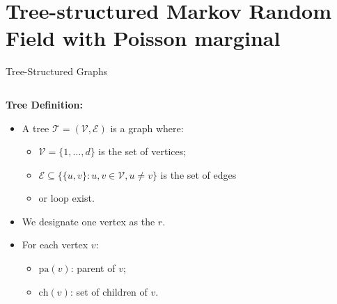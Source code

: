 \documentclass[11pt,xcolor={dvipsnames},hyperref={pdftex,pdfpagemode=UseNone,hidelinks,pdfdisplaydoctitle=true},usepdftitle=false]{beamer}
\begin{document}
\section{Tree-structured Markov Random Field with Poisson marginal}
\begin{frame}{Tree-Structured Graphs}
\begin{columns}
    \begin{column}{0.6\textwidth}
        \textbf{Tree Definition:}
        \begin{itemize}
            \item A tree $\mathcal{T}=(\mathcal{V},\mathcal{E})$ is a graph where:
            \begin{itemize}
                \item $\mathcal{V}=\{1,\ldots,d\}$ is the set of vertices;
            \item $\mathcal{E} \subseteq \{\{u,v\} : u,v \in \mathcal{V}, u \neq v\}$ is the set of edges
            \item {} or loop exist.
            \end{itemize}
            \item We designate one vertex as the  $r$.
            \item For each vertex $v$:
            \begin{itemize}
                \item $\mathrm{pa}(v)$: parent of $v$;
                \item $\mathrm{ch}(v)$: set of children of $v$.
            \end{itemize}
        \end{itemize}
    \end{column}
    \begin{column}{0.4\textwidth}
    \end{column}
\end{columns}
\end{frame}
\end{document}

